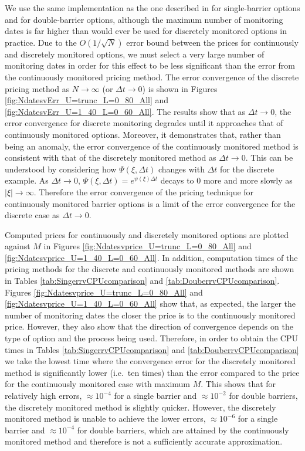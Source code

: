 \documentclass[11pt,a4paper]{article}
\begin{document}
We use the same implementation as the one described in \cite{Fusai2016} for single-barrier options and \cite{Phelan2017} for double-barrier options, although the maximum number of monitoring dates is far higher than would ever be used for discretely monitored options in practice. Due to the $O(1/\sqrt{N})$ error bound between the prices for continuously and discretely monitored options, we must select a very large number of monitoring dates in order for this effect to be less significant than the error from the continuously monitored pricing method. The error convergence of the discrete pricing method as $N\rightarrow\infty$ (or $\Delta t\rightarrow0$) is shown in Figures \ref{fig:NdatesvErr_U=trunc_L=0_80_All} and \ref{fig:NdatesvErr_U=1_40_L=0_60_All}. The results show that as $\Delta t\rightarrow0$, the error convergence for discrete monitoring degrades until it approaches that of continuously monitored options. Moreover, it demonstrates that, rather than being an anomaly, the error convergence of the continuously monitored method is consistent with that of the discretely monitored method as $\Delta t\rightarrow0$. This can be understood by considering how $\Psi(\xi,\Delta t)$ changes with $\Delta t$ for the discrete example. As $\Delta t\rightarrow 0$, $\Psi(\xi,\Delta t)=e^{\psi(\xi)\Delta t}$ decays to $0$ more and more slowly as $|\xi|\rightarrow\infty$. Therefore the error convergence of the pricing technique for continuously monitored barrier options is a limit of the error convergence for the discrete case as $\Delta t\rightarrow 0$.

Computed prices for continuously and discretely monitored options are plotted against $M$ in Figures \ref{fig:Ndatesvprice_U=trunc_L=0_80_All} and \ref{fig:Ndatesvprice_U=1_40_L=0_60_All}. In addition, computation times of the pricing methods for the discrete and continuously monitored methods are shown in Tables \ref{tab:SingerrvCPUcomparison} and \ref{tab:DouberrvCPUcomparison}. Figures \ref{fig:Ndatesvprice_U=trunc_L=0_80_All} and \ref{fig:Ndatesvprice_U=1_40_L=0_60_All} show that, as expected, the larger the number of monitoring dates the closer the price is to the continuously monitored price. However, they also show that the direction of convergence depends on the type of option and the process being used. Therefore, in order to obtain the CPU times in Tables \ref{tab:SingerrvCPUcomparison} and \ref{tab:DouberrvCPUcomparison} we take the lowest time where the convergence error for the discretely monitored method is significantly lower (i.e.\ ten times) than the error compared to the price for the continuously monitored case with maximum $M$. This shows that for relatively high errors, $\approx10^{-4}$ for a single barrier and $\approx10^{-2}$ for double barriers, the discretely monitored method is slightly quicker. However, the discretely monitored method is unable to achieve the lower errors, $\approx10^{-6}$ for a single barrier and $\approx10^{-4}$ for double barriers, which are attained by the continuously monitored method and therefore is not a sufficiently accurate approximation.
\end{document}
